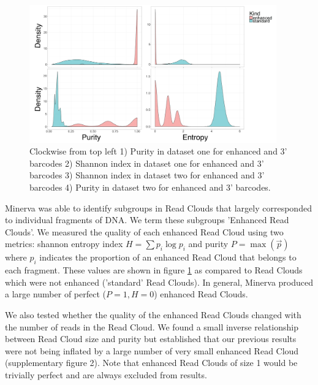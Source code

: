 \begin{figure}
  \vspace{-20pt}
  \begin{center}
    \includegraphics[width=0.95\textwidth]{figures/purity_fig_clean_copy.jpg}
	\vspace{5pt}
	\caption{\small{Clockwise from top left 1) Purity in dataset one for enhanced and 3' barcodes 2) Shannon index in dataset one for enhanced and 3' barcodes 3) Shannon index in dataset two for enhanced and 3' barcodes 4) Purity in dataset two for enhanced and 3' barcodes.}}
    \label{fig:purity}
  \end{center}
  \vspace{-10pt}
\end{figure}

Minerva was able to identify subgroups in Read Clouds that largely corresponded to individual fragments of DNA. We term these subgroups 'Enhanced Read Clouds'. We measured the quality of each enhanced Read Cloud using two metrics: shannon entropy index $H = \sum{p_i\log{p_i}}$ and purity $P = \max(\vec{p})$ where $p_i$ indicates the proportion of an enhanced Read Cloud that belongs to each fragment. These values are shown in figure \ref{fig:purity} as compared to Read Clouds which were not enhanced ('standard' Read Clouds). In general, Minerva produced a large number of perfect ($P=1, H=0$) enhanced Read Clouds.

We also tested whether the quality of the enhanced Read Clouds changed with the number of reads in the Read Cloud. We found a small inverse relationship between Read Cloud size and purity but established that our previous results were not being inflated by a large number of very small enhanced Read Cloud (supplementary figure 2). Note that enhanced Read Clouds of size 1 would be trivially perfect and are always excluded from results. 

